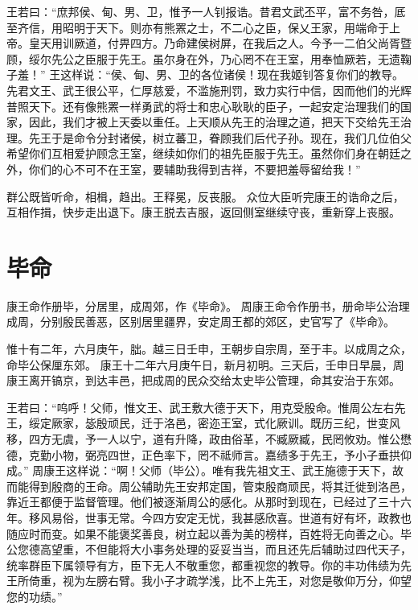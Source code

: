 \documentclass[12pt,UTF8]{ctexbook}
\begin{document}
王若曰：“庶邦侯、甸、男、卫，惟予一人钊报诰。昔君文武丕平，富不务咎，厎至齐信，用昭明于天下。则亦有熊罴之士，不二心之臣，保乂王家，用端命于上帝。皇天用训厥道，付畀四方。乃命建侯树屏，在我后之人。今予一二伯父尚胥暨顾，绥尔先公之臣服于先王。虽尔身在外，乃心罔不在王室，用奉恤厥若，无遗鞠子羞！”
王这样说：“侯、甸、男、卫的各位诸侯！现在我姬钊答复你们的教导。先君文王、武王很公平，仁厚慈爱，不滥施刑罚，致力实行中信，因而他们的光辉普照天下。还有像熊罴一样勇武的将士和忠心耿耿的臣子，一起安定治理我们的国家，因此，我们才被上天委以重任。上天顺从先王的治理之道，把天下交给先王治理。先王于是命令分封诸侯，树立蕃卫，眷顾我们后代子孙。现在，我们几位伯父希望你们互相爱护顾念王室，继续如你们的祖先臣服于先王。虽然你们身在朝廷之外，你们的心不可不在王室，要辅助我得到吉祥，不要把羞辱留给我！”

群公既皆听命，相楫，趋出。王释冕，反丧服。
众位大臣听完康王的诰命之后，互相作揖，快步走出退下。康王脱去吉服，返回侧室继续守丧，重新穿上丧服。

\chapter{毕命}

康王命作册毕，分居里，成周郊，作《毕命》。
周康王命令作册书，册命毕公治理成周，分别殷民善恶，区别居里疆界，安定周王都的郊区，史官写了《毕命》。

惟十有二年，六月庚午，朏。越三日壬申，王朝步自宗周，至于丰。以成周之众，命毕公保厘东郊。
康王十二年六月庚午日，新月初明。三天后，壬申日早晨，周康王离开镐京，到达丰邑，把成周的民众交给太史毕公管理，命其安治于东郊。

王若曰：“呜呼！父师，惟文王、武王敷大德于天下，用克受殷命。惟周公左右先王，绥定厥家，毖殷顽民，迁于洛邑，密迩王室，式化厥训。既历三纪，世变风移，四方无虞，予一人以宁，道有升降，政由俗革，不臧厥臧，民罔攸劝。惟公懋德，克勤小物，弼亮四世，正色率下，罔不祗师言。嘉绩多于先王，予小子垂拱仰成。”
周康王这样说：“啊！父师（毕公）。唯有我先祖文王、武王施德于天下，故而能得到殷商的王命。周公辅助先王安邦定国，管束殷商顽民，将其迁徙到洛邑，靠近王都便于监督管理。他们被逐渐周公的感化。从那时到现在，已经过了三十六年。移风易俗，世事无常。今四方安定无忧，我甚感欣喜。世道有好有坏，政教也随应时而变。如果不能褒奖善良，树立起以善为美的榜样，百姓将无向善之心。毕公您德高望重，不但能将大小事务处理的妥妥当当，而且还先后辅助过四代天子，统率群臣下属领导有方，臣下无人不敬重您，都重视您的教导。你的丰功伟绩为先王所倚重，视为左膀右臂。我小子才疏学浅，比不上先王，对您是敬仰万分，仰望您的功绩。”
\end{document}
